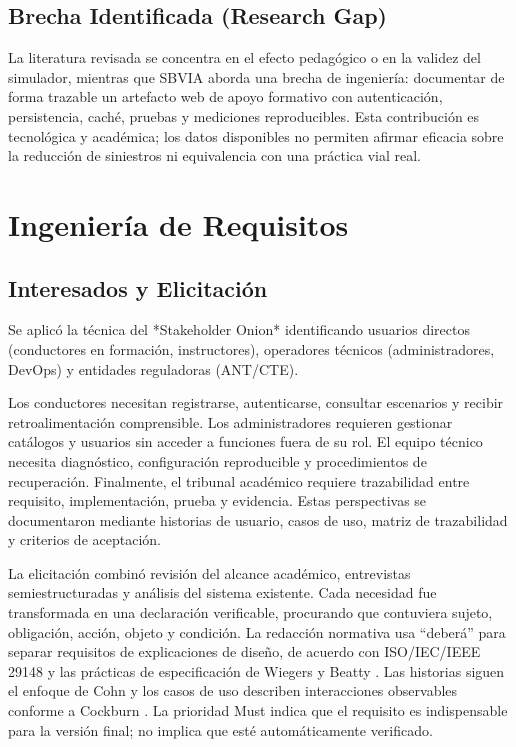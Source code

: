 \documentclass[11pt,a4paper]{report}
\begin{document}
\section{Brecha Identificada (Research Gap)}
La literatura revisada se concentra en el efecto pedagógico o en la validez del simulador, mientras que SBVIA aborda una brecha de ingeniería: documentar de forma trazable un artefacto web de apoyo formativo con autenticación, persistencia, caché, pruebas y mediciones reproducibles. Esta contribución es tecnológica y académica; los datos disponibles no permiten afirmar eficacia sobre la reducción de siniestros ni equivalencia con una práctica vial real.

\chapter{Ingeniería de Requisitos}
\section{Interesados y Elicitación}
Se aplicó la técnica del *Stakeholder Onion* identificando usuarios directos (conductores en formación, instructores), operadores técnicos (administradores, DevOps) y entidades reguladoras (ANT/CTE).

Los conductores necesitan registrarse, autenticarse, consultar escenarios y recibir retroalimentación comprensible. Los administradores requieren gestionar catálogos y usuarios sin acceder a funciones fuera de su rol. El equipo técnico necesita diagnóstico, configuración reproducible y procedimientos de recuperación. Finalmente, el tribunal académico requiere trazabilidad entre requisito, implementación, prueba y evidencia. Estas perspectivas se documentaron mediante historias de usuario, casos de uso, matriz de trazabilidad y criterios de aceptación.

La elicitación combinó revisión del alcance académico, entrevistas semiestructuradas y análisis del sistema existente. Cada necesidad fue transformada en una declaración verificable, procurando que contuviera sujeto, obligación, acción, objeto y condición. La redacción normativa usa ``deberá'' para separar requisitos de explicaciones de diseño, de acuerdo con ISO/IEC/IEEE 29148 \cite{iso29148} y las prácticas de especificación de Wiegers y Beatty \cite{wiegers2013software}. Las historias siguen el enfoque de Cohn \cite{cohn2004user} y los casos de uso describen interacciones observables conforme a Cockburn \cite{cockburn2001writing}. La prioridad Must indica que el requisito es indispensable para la versión final; no implica que esté automáticamente verificado.
\end{document}
